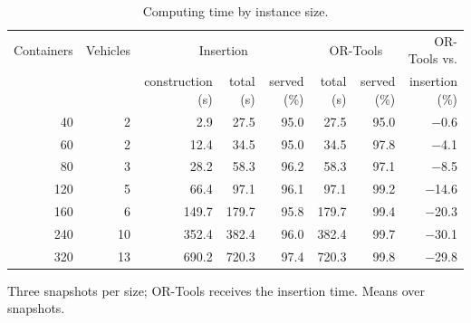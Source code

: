 \begin{table}[!htbp]
\caption{Computing time by instance size.}
\label{tab:scale}
\centering
\small
\setlength{\tabcolsep}{3pt}
\begin{tabular}{rrrrrrrr}
\toprule
Containers & Vehicles & \multicolumn{3}{c}{Insertion} & \multicolumn{2}{c}{OR-Tools} & OR-Tools vs. \\
\cmidrule(lr){3-5}\cmidrule(lr){6-7}
 & & construction (s) & total (s) & served (\%) & total (s) & served (\%) & insertion (\%) \\
\midrule
40 & 2 & 2.9 & 27.5 & 95.0 & 27.5 & 95.0 & \ensuremath{-}0.6 \\
60 & 2 & 12.4 & 34.5 & 95.0 & 34.5 & 97.8 & \ensuremath{-}4.1 \\
80 & 3 & 28.2 & 58.3 & 96.2 & 58.3 & 97.1 & \ensuremath{-}8.5 \\
120 & 5 & 66.4 & 97.1 & 96.1 & 97.1 & 99.2 & \ensuremath{-}14.6 \\
160 & 6 & 149.7 & 179.7 & 95.8 & 179.7 & 99.4 & \ensuremath{-}20.3 \\
240 & 10 & 352.4 & 382.4 & 96.0 & 382.4 & 99.7 & \ensuremath{-}30.1 \\
320 & 13 & 690.2 & 720.3 & 97.4 & 720.3 & 99.8 & \ensuremath{-}29.8 \\
\bottomrule
\end{tabular}
\par\smallskip\footnotesize Three snapshots per size; OR-Tools receives the insertion time. Means over snapshots.
\end{table}
